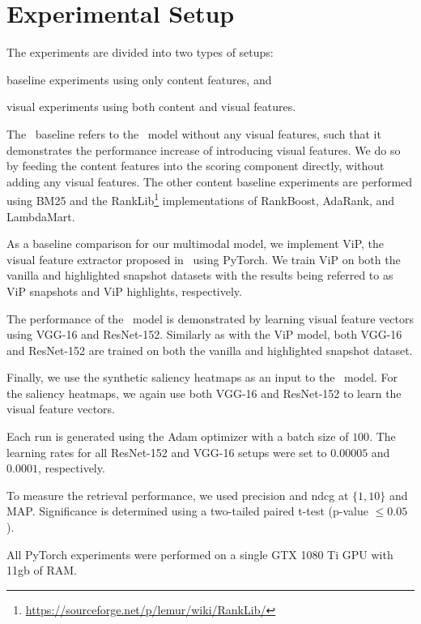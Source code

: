 
\section{Experimental Setup}\label{sec:setup}
The experiments are divided into two types of setups:
\begin{inparaenum}[(i)]
\item baseline experiments using only content features, and
\item visual experiments using both content and visual features.
\end{inparaenum}

The \modelname~baseline refers to the \modelname~model without any visual features, such that it demonstrates the performance increase of introducing visual features. We do so by feeding the content features into the scoring component directly, without adding any visual features. 
The other content baseline experiments are performed using BM25 and the RankLib\footnote{\url{https://sourceforge.net/p/lemur/wiki/RankLib/}} implementations of RankBoost, AdaRank, and LambdaMart.

As a baseline comparison for our multimodal model, we implement ViP, the visual feature extractor proposed in~\citet{fan2017learning} using PyTorch. We train ViP on both the vanilla and highlighted snapshot datasets with the results being referred to as ViP snapshots and ViP highlights, respectively.

The performance of the \modelname~model is demonstrated by learning visual feature vectors using VGG-16 and ResNet-152. Similarly as with the ViP model, both VGG-16 and ResNet-152 are trained on both the vanilla and highlighted snapshot dataset. 

Finally, we use the synthetic saliency heatmaps as an input to the \modelname~model. For the saliency heatmaps, we again use both VGG-16 and ResNet-152 to learn the visual feature vectors.

Each run is generated using the Adam optimizer with a batch size of $100$. The learning rates for all ResNet-152 and VGG-16 setups were set to $0.00005$ and $0.0001$, respectively. 

To measure the retrieval performance, we used precision and ndcg at $\{1,10\}$ and MAP.
Significance is determined using a two-tailed paired t-test (p-value $\leq 0.05$). 

All PyTorch experiments were performed on a single GTX 1080 Ti GPU with 11gb of RAM. 



